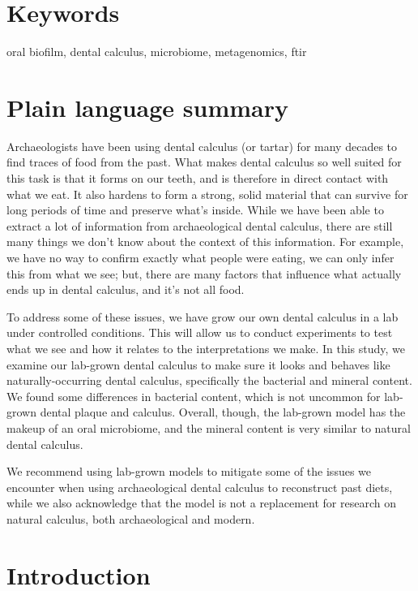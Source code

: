 \documentclass[10pt,a4paper]{article}
\begin{document}
\section*{\color{OREblue}Keywords}

oral biofilm, dental calculus, microbiome, metagenomics, ftir


\clearpage
\pagestyle{fancy}

\section*{Plain language summary}

Archaeologists have been using dental calculus (or tartar) for many
decades to find traces of food from the past. What makes dental calculus
so well suited for this task is that it forms on our teeth, and is
therefore in direct contact with what we eat. It also hardens to form a
strong, solid material that can survive for long periods of time and
preserve what's inside. While we have been able to extract a lot of
information from archaeological dental calculus, there are still many
things we don't know about the context of this information. For example,
we have no way to confirm exactly what people were eating, we can only
infer this from what we see; but, there are many factors that influence
what actually ends up in dental calculus, and it's not all food.

To address some of these issues, we have grow our own dental calculus in
a lab under controlled conditions. This will allow us to conduct
experiments to test what we see and how it relates to the
interpretations we make. In this study, we examine our lab-grown dental
calculus to make sure it looks and behaves like naturally-occurring
dental calculus, specifically the bacterial and mineral content. We
found some differences in bacterial content, which is not uncommon for
lab-grown dental plaque and calculus. Overall, though, the lab-grown
model has the makeup of an oral microbiome, and the mineral content is
very similar to natural dental calculus.

We recommend using lab-grown models to mitigate some of the issues we
encounter when using archaeological dental calculus to reconstruct past
diets, while we also acknowledge that the model is not a replacement for
research on natural calculus, both archaeological and modern.

\newcommand{\pandocbounded}[1]{#1}

\section{Introduction}\label{introduction}
\end{document}

